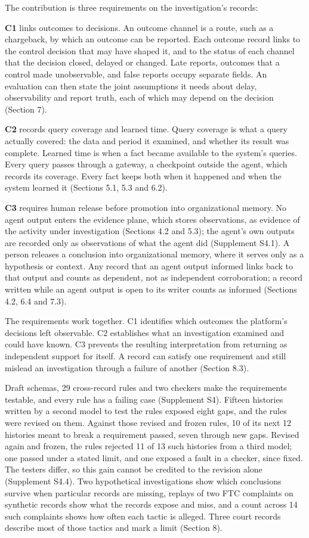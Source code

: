 \documentclass[
  11pt,
]{article}
\begin{document}
The contribution is three requirements on the investigation's records:

\textbf{C1} links outcomes to decisions. An outcome channel is a route,
such as a chargeback, by which an outcome can be reported. Each outcome
record links to the control decision that may have shaped it, and to the
status of each channel that the decision closed, delayed or changed.
Late reports, outcomes that a control made unobservable, and false
reports occupy separate fields. An evaluation can then state the joint
assumptions it needs about delay, observability and report truth, each
of which may depend on the decision (Section 7).

\textbf{C2} records query coverage and learned time. Query coverage is
what a query actually covered: the data and period it examined, and
whether its result was complete. Learned time is when a fact became
available to the system's queries. Every query passes through a gateway,
a checkpoint outside the agent, which records its coverage. Every fact
keeps both when it happened and when the system learned it (Sections
5.1, 5.3 and 6.2).

\textbf{C3} requires human release before promotion into organizational
memory. No agent output enters the evidence plane, which stores
observations, as evidence of the activity under investigation (Sections
4.2 and 5.3); the agent's own outputs are recorded only as observations
of what the agent did (Supplement S4.1). A person releases a conclusion
into organizational memory, where it serves only as a hypothesis or
context. Any record that an agent output informed links back to that
output and counts as dependent, not as independent corroboration; a
record written while an agent output is open to its writer counts as
informed (Sections 4.2, 6.4 and 7.3).

The requirements work together. C1 identifies which outcomes the
platform's decisions left observable. C2 establishes what an
investigation examined and could have known. C3 prevents the resulting
interpretation from returning as independent support for itself. A
record can satisfy one requirement and still mislead an investigation
through a failure of another (Section 8.3).

Draft schemas, 29 cross-record rules and two checkers make the
requirements testable, and every rule has a failing case (Supplement
S4). Fifteen histories written by a second model to test the rules
exposed eight gaps, and the rules were revised on them. Against those
revised and frozen rules, 10 of its next 12 histories meant to break a
requirement passed, seven through new gaps. Revised again and frozen,
the rules rejected 11 of 13 such histories from a third model; one
passed under a stated limit, and one exposed a fault in a checker, since
fixed. The testers differ, so this gain cannot be credited to the
revision alone (Supplement S4.4). Two hypothetical investigations show
which conclusions survive when particular records are missing, replays
of two FTC complaints on synthetic records show what the records expose
and miss, and a count across 14 such complaints shows how often each
tactic is alleged. Three court records describe most of those tactics
and mark a limit (Section 8).
\end{document}
